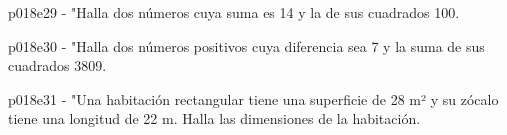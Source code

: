 \documentclass[spanish, 11pt]{exam}
\begin{document}
\begin{questions}
\begin{multicols}{2}
        \end{multicols}
        \question p018e29 - "Halla dos números cuya suma es 14 y la de sus cuadrados 100.
        \begin{multicols}{2} 
        \end{multicols}
        \question p018e30 - "Halla dos números positivos cuya diferencia sea 7 y la suma de sus cuadrados 3809.
        \begin{multicols}{2} 
        \end{multicols}
        \question p018e31 - "Una habitación rectangular tiene una superficie de 28 m² y 
su zócalo tiene una longitud de 22 m. Halla las
dimensiones de la habitación.
        \begin{multicols}{2} 
        \end{multicols}
        
    \end{questions}
    
\end{document}
